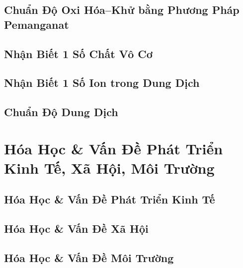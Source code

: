 \documentclass{article}
\numberwithin{equation}{section}
\begin{document}

\subsection{Chuẩn Độ Oxi Hóa--Khử bằng Phương Pháp Pemanganat}


\subsection{Nhận Biết 1 Số Chất Vô Cơ}


\subsection{Nhận Biết 1 Số Ion trong Dung Dịch}


\subsection{Chuẩn Độ Dung Dịch}


\section{Hóa Học \& Vấn Đề Phát Triển Kinh Tế, Xã Hội, Môi Trường}

\subsection{Hóa Học \& Vấn Đề Phát Triển Kinh Tế}


\subsection{Hóa Học \& Vấn Đề Xã Hội}


\subsection{Hóa Học \& Vấn Đề Môi Trường}


\newpage
\printbibliography[heading=bibintoc]
	
\end{document}
